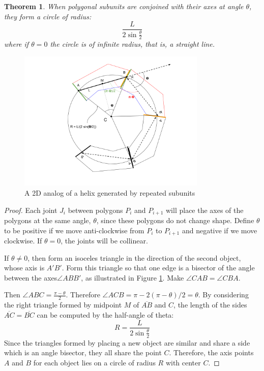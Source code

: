 \documentclass[11pt]{article}
\newtheorem{theorem}{Theorem}
\begin{document}
{\begin{theorem}
  When polygonal subunits are conjoined with their axes at angle $\theta$, they form a
  circle of radius:
  \[
\frac{L}{2 \sin{\frac{\theta}{2}}}
\]
where if $\theta = 0$ the circle is of infinite radius, that is, a straight line.
  \end{theorem}
\begin{figure}
     \centering
     \includegraphics[width=0.80\textwidth]{figures/2DPolygonStacking.png}
     \caption{A 2D analog of a helix generated by repeated subunits}
  \label{fig:prismdiagram}
\end{figure}

\begin{proof}

Each joint $J_i$ between polygons $P_i$ and $P_{i+1}$ will place the axes of the polygons at the same angle, $\theta$, since
these polygons do not change shape. Define $\theta$ to be positive
if we move anti-clockwise from $P_i$ to $P_{i+1}$ and negative if we move clockwise.
If $\theta = 0$, the joints will be collinear.

If $\theta \neq 0$, then form an isoceles triangle in the direction of the second
object, whose axis is $A'B'$.
Form this triangle so that one edge is a bisector of the angle between the axes$\angle ABB'$,
as illustrated in Figure \ref{fig:prismdiagram}.
Make $\angle CAB = \angle CBA$.

Then $\angle ABC = \frac{\pi - \theta}{2}$. Therefore $\angle ACB = \pi - 2(\pi-\theta)/2 = \theta$.
By considering the right triangle formed by midpoint $M$ of $\overline{AB}$ and $C$,
the length of the sides $\overline{AC} = \overline{BC}$ can be computed by the half-angle
of theta:
\[
R = \frac{L}{2 \sin{\frac{\theta}{2}}}
\]
Since the triangles formed by placing a new object are similar and share a side which
is an angle bisector, they all share the point $C$. Therefore, the axis points $A$ and $B$
for each object lies on a circle of radius $R$ with center $C$.
\end{proof}


}
\end{document}
